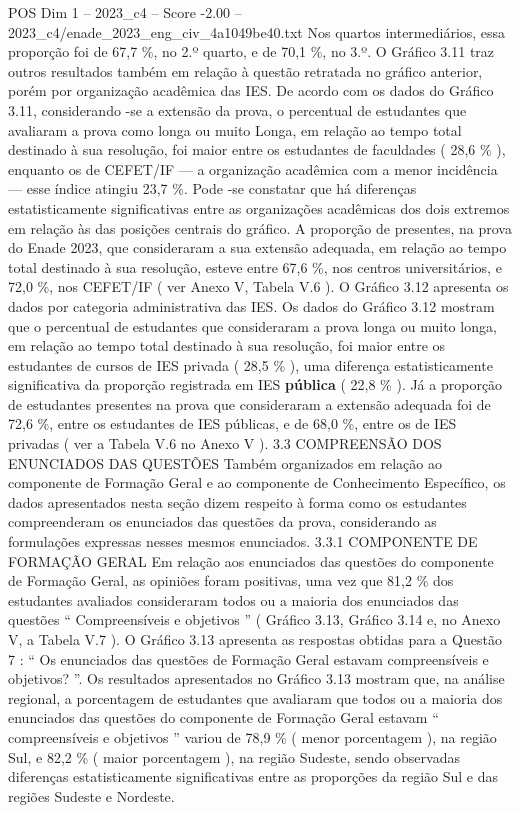 \begin{textsample}{POS Dim 1 – 2023\_c4 – Score -2.00 – 2023\_c4/enade\_2023\_eng\_civ\_4a1049be40.txt}
Nos quartos intermediários, essa proporção foi de 67,7 \%, no 2.º quarto, e de 70,1 \%, no 3.º.
O Gráfico 3.11 traz outros resultados também em relação à questão retratada no gráfico anterior, porém por organização acadêmica das IES.
De acordo com os dados do Gráfico 3.11, considerando -se a extensão da prova, o percentual de estudantes que avaliaram a prova como longa ou muito Longa, em relação ao tempo total destinado à sua resolução, foi maior entre os estudantes de faculdades ( 28,6 \% ), enquanto os de CEFET/IF — a organização acadêmica com a menor incidência — esse índice atingiu 23,7 \%.
Pode -se constatar que há diferenças estatisticamente significativas entre as organizações acadêmicas dos dois extremos em relação às das posições centrais do gráfico.
A proporção de presentes, na prova do Enade 2023, que consideraram a sua extensão adequada, em relação ao tempo total destinado à sua resolução, esteve entre 67,6 \%, nos centros universitários, e 72,0 \%, nos CEFET/IF ( ver Anexo V, Tabela V.6 ).
O Gráfico 3.12 apresenta os dados por categoria administrativa das IES.
Os dados do Gráfico 3.12 mostram que o percentual de estudantes que consideraram a prova longa ou muito longa, em relação ao tempo total destinado à sua resolução, foi maior entre os estudantes de cursos de IES privada ( 28,5 \% ), uma diferença estatisticamente significativa da proporção registrada em IES \textbf{pública} ( 22,8 \% ).
Já a proporção de estudantes presentes na prova que consideraram a extensão adequada foi de 72,6 \%, entre os estudantes de IES públicas, e de 68,0 \%, entre os de IES privadas ( ver a Tabela V.6 no Anexo V ). 3.3 COMPREENSÃO DOS ENUNCIADOS DAS QUESTÕES Também organizados em relação ao componente de Formação Geral e ao componente de Conhecimento Específico, os dados apresentados nesta seção dizem respeito à forma como os estudantes compreenderam os enunciados das questões da prova, considerando as formulações expressas nesses mesmos enunciados. 3.3.1 COMPONENTE DE FORMAÇÃO GERAL Em relação aos enunciados das questões do componente de Formação Geral, as opiniões foram positivas, uma vez que 81,2 \% dos estudantes avaliados consideraram todos ou a maioria dos enunciados das questões “ Compreensíveis e objetivos ” ( Gráfico 3.13, Gráfico 3.14 e, no Anexo V, a Tabela V.7 ).
O Gráfico 3.13 apresenta as respostas obtidas para a Questão 7 : “ Os enunciados das questões de Formação Geral estavam compreensíveis e objetivos? ”.
Os resultados apresentados no Gráfico 3.13 mostram que, na análise regional, a porcentagem de estudantes que avaliaram que todos ou a maioria dos enunciados das questões do componente de Formação Geral estavam “ compreensíveis e objetivos ” variou de 78,9 \% ( menor porcentagem ), na região Sul, e 82,2 \% ( maior porcentagem ), na região Sudeste, sendo observadas diferenças estatisticamente significativas entre as proporções da região Sul e das regiões Sudeste e Nordeste.

\end{textsample}
